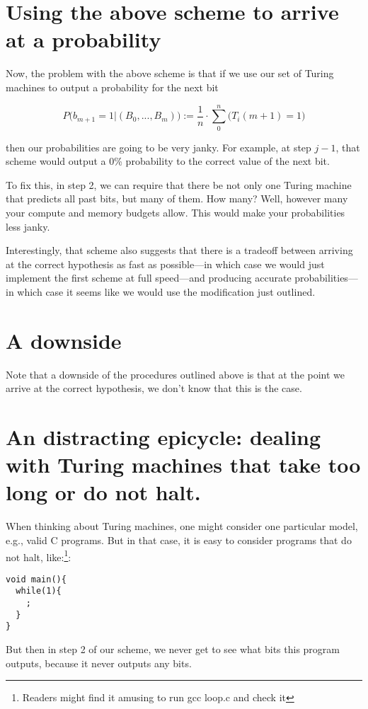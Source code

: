 \documentclass[12pt,authoryear]{elsarticle}
\begin{document}
\section{Using the above scheme to arrive at a probability }

Now, the problem with the above scheme is that if we use our set of Turing machines to output a probability for the next bit

$$ P\Big(b_{m + 1} = 1 | (B_0, ..., B_m) \Big) := \frac{1}{n} \cdot \sum_0^n \Big(T_i(m+1) = 1\Big) $$

then our probabilities are going to be very janky. For example, at step $ j - 1 $, that scheme would output a 0\% probability to the correct value of the next bit.

To fix this, in step 2, we can require that there be not only one Turing machine that predicts all past bits, but many of them. How many? Well, however many your compute and memory budgets allow. This would make your probabilities less janky. 

Interestingly, that scheme also suggests that there is a tradeoff between arriving at the correct hypothesis as fast as possible—in which case we would just implement the first scheme at full speed—and producing accurate probabilities—in which case it seems like we would use the modification just outlined.

\section{A downside}
Note that a downside of the procedures outlined above is that at the point we arrive at the correct hypothesis, we don't know that this is the case.

\section{An distracting epicycle: dealing with Turing machines that take too long or do not halt.}

When thinking about Turing machines, one might consider one particular model, e.g., valid C programs. But in that case, it is easy to consider programs that do not halt, like:\footnote{Readers might find it amusing to run gcc loop.c and check it}:

\begin{verbatim}
void main(){
  while(1){
    ;
  }
}
\end{verbatim}

But then in step 2 of our scheme, we never get to see what bits this program outputs, because it never outputs any bits.
\end{document}
